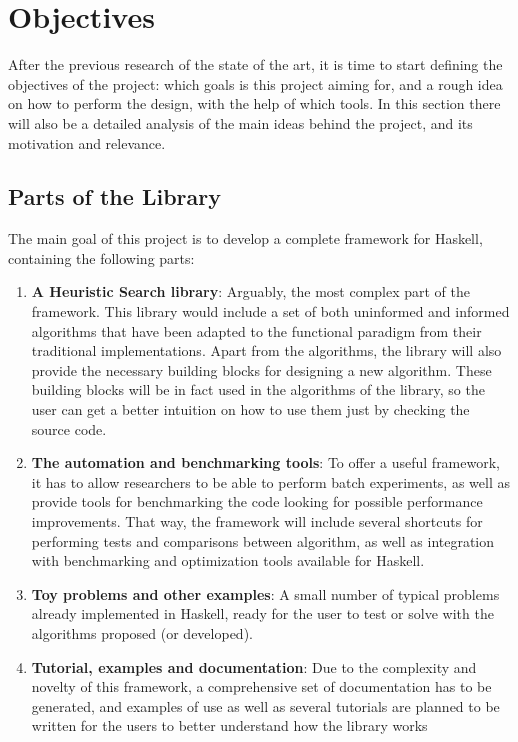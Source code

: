 \section{Objectives}

After the previous research of the state of the art, it is time to start
defining the objectives of the project: which goals is this project aiming for,
and a rough idea on how to perform the design, with the help of which tools. In
this section there will also be a detailed analysis of the main ideas behind
the project, and its motivation and relevance.\\

\subsection{Parts of the Library}

The main goal of this project is to develop a complete framework for Haskell,
containing the following parts:

\begin{enumerate}
\item \textbf{A Heuristic Search library}: Arguably, the most complex part of
  the framework. This library would include a set of both uninformed and
  informed algorithms that have been adapted to the functional paradigm from
  their traditional implementations. Apart from the algorithms, the library
  will also provide the necessary building blocks for designing a new
  algorithm. These building blocks will be in fact used in the algorithms of
  the library, so the user can get a better intuition on how to use them just
  by checking the source code.
\item \textbf{The automation and benchmarking tools}: To offer a useful
  framework, it has to allow researchers to be able to perform batch
  experiments, as well as provide tools for benchmarking the code looking for
  possible performance improvements. That way, the framework will include
  several shortcuts for performing tests and comparisons between algorithm, as
  well as integration with benchmarking and optimization tools available for
  Haskell.
\item \textbf{Toy problems and other examples}: A small number of typical
  problems already implemented in Haskell, ready for the user to test or solve
  with the algorithms proposed (or developed).
\item \textbf{Tutorial, examples and documentation}: Due to the complexity and
  novelty of this framework, a comprehensive set of documentation has to be
  generated, and examples of use as well as several tutorials are planned to be
  written for the users to better understand how the library works
\end{enumerate}

